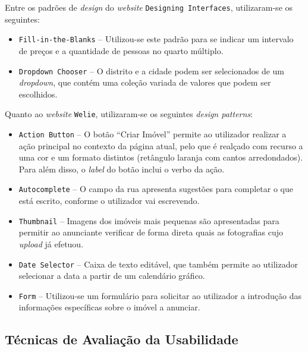 Entre os padrões de \textit{design} do \textit{website} \texttt{Designing Interfaces}, utilizaram-se os seguintes:

\begin{itemize}
    \item \texttt{Fill-in-the-Blanks} -- Utilizou-se este padrão para se indicar um intervalo de preços e a quantidade de pessoas no quarto múltiplo.
    
    \item \texttt{Dropdown Chooser} -- O distrito e a cidade podem ser selecionados de um \textit{dropdown}, que contém uma coleção variada de valores que podem ser escolhidos.
\end{itemize}

Quanto ao \textit{website} \texttt{Welie}, utilizaram-se os seguintes \textit{design patterns}:

\begin{itemize}
    \item \texttt{Action Button} -- O botão ``Criar Imóvel'' permite ao utilizador realizar a ação principal no contexto da página atual, pelo que é realçado com recurso a uma cor e um formato distintos (retângulo laranja com cantos arredondados). Para além disso, o \textit{label} do botão inclui o verbo da ação.

    \item \texttt{Autocomplete} -- O campo da rua apresenta sugestões para completar o que está escrito, conforme o utilizador vai escrevendo.
    
    \item \texttt{Thumbnail} -- Imagens dos imóveis mais pequenas são apresentadas para permitir ao anunciante verificar de forma direta quais as fotografias cujo \textit{upload} já efetuou.
    
    \item \texttt{Date Selector} -- Caixa de texto editável, que também permite ao utilizador selecionar a data a partir de um calendário gráfico.
    
    \item \texttt{Form} -- Utilizou-se um formulário para solicitar ao utilizador a introdução das informações específicas sobre o imóvel a anunciar.
\end{itemize}


\subsection{Técnicas de Avaliação da Usabilidade}

